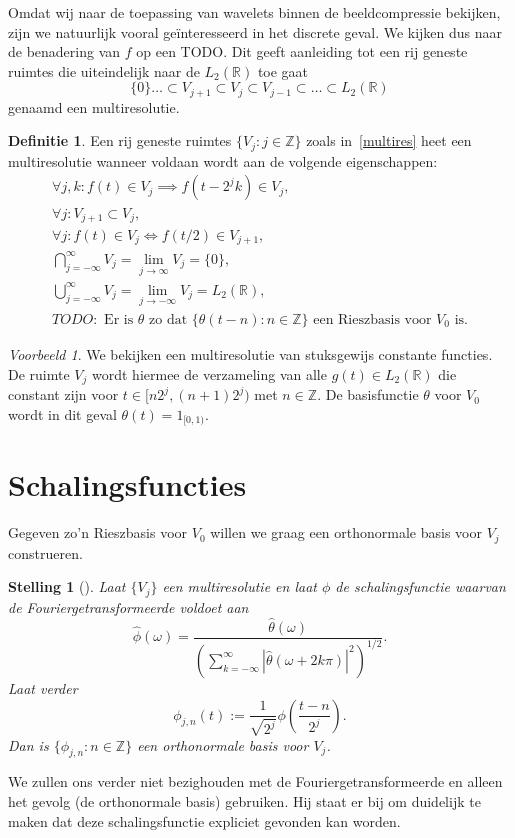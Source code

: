 \documentclass[11pt]{report}
\theoremstyle{plain}
\newtheorem{stelling}{Stelling}
\theoremstyle{definition}
\newtheorem{definitie}{Definitie}
\theoremstyle{remark}
\newtheorem*{voorbeeld}{Voorbeeld}
\newcommand{\R}{\mathbb{R}}
\newcommand{\Z}{\mathbb{Z}}
\begin{document}
Omdat wij naar de toepassing van wavelets binnen de beeldcompressie bekijken, zijn we natuurlijk vooral ge\"interesseerd in het discrete geval. We kijken dus naar de benadering van $f$ op een TODO. Dit geeft aanleiding tot een rij geneste ruimtes die uiteindelijk naar de $L_2(\R)$ toe gaat
\begin{equation}
  \label{multires}
  \{0\} \ldots \subset V_{j+1} \subset V_j \subset V_{j-1} \subset \ldots \subset L_2(\R)
\end{equation}
genaamd een multiresolutie.
\begin{definitie}
Een rij geneste ruimtes $\{ V_j: j \in \Z \}$ zoals in~\ref{multires} heet een multiresolutie wanneer voldaan wordt aan de volgende eigenschappen:
\begin{eqnarray}
  \forall j, k: f(t) \in V_j \implies f(t - 2^j k) \in V_j, \\
  \forall j: V_{j+1} \subset V_j, \\
  \forall j: f(t) \in V_j \iff f(t/2) \in V_{j+1}, \\
  \bigcap_{j=-\infty}^{\infty} V_{j} = \lim_{j\to\infty} V_j = \{0\}, \\
  \bigcup_{j=-\infty}^{\infty} V_j = \lim_{j\to-\infty} V_j = L_2(\R), \\
  TODO: \text{ Er is $\theta$ zo dat $\{ \theta(t-n): n \in \Z \}$ een Rieszbasis voor $V_0$ is.}
\end{eqnarray}
\end{definitie}

\begin{voorbeeld} We bekijken een multiresolutie van stuksgewijs constante functies. De ruimte $V_j$ wordt hiermee de verzameling van alle $g(t) \in L_2(\R)$ die constant zijn voor $t \in [n 2^j, (n+1)2^j)$ met $n \in \Z$. De basisfunctie $\theta$ voor $V_0$ wordt in dit geval $\theta(t) = 1_{[0,1)}$. \end{voorbeeld}

\section{Schalingsfuncties}
Gegeven zo'n Rieszbasis voor $V_0$ willen we graag een orthonormale basis voor $V_j$ construeren. 
\begin{stelling}[{\cite[T7.1]{mallat}}] 
  Laat $\{ V_j \}$ een multiresolutie en laat $\phi$ de schalingsfunctie waarvan de Fouriergetransformeerde voldoet aan
  \[
    \hat{\phi}(\omega) = \frac{\hat{\theta}(\omega)}{\left( \sum_{k=-\infty}^\infty | \hat{\theta}(\omega + 2k \pi) |^2 \right)^{1/2}}.
  \]
  Laat verder
  \[
    \phi_{j,n}(t) := \frac{1}{\sqrt{2^j}} \phi\left( \frac{t-n}{2^j} \right).
  \]
  Dan is $\{ \phi_{j,n}: n \in \Z \}$ een orthonormale basis voor $V_j$.
\end{stelling}
We zullen ons verder niet bezighouden met de Fouriergetransformeerde en alleen het gevolg (de orthonormale basis) gebruiken. Hij staat er bij om duidelijk te maken dat deze schalingsfunctie expliciet gevonden kan worden.
\end{document}
